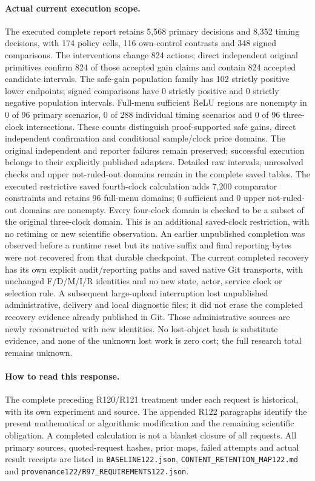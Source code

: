 \paragraph{Actual current execution scope.}
The executed complete report retains 5,568 primary decisions and 8,352 timing decisions, with 174 policy cells, 116 own-control contrasts and 348 signed comparisons. The interventions change 824 actions; direct independent original primitives confirm 824 of those accepted gain claims and contain 824 accepted candidate intervals. The safe-gain population family has 102 strictly positive lower endpoints; signed comparisons have 0 strictly positive and 0 strictly negative population intervals. Full-menu sufficient ReLU regions are nonempty in 0 of 96 primary scenarios, 0 of 288 individual timing scenarios and 0 of 96 three-clock intersections. These counts distinguish proof-supported safe gains, direct independent confirmation and conditional sample/clock price domains. The original independent and reporter failures remain preserved; successful execution belongs to their explicitly published adapters. Detailed raw intervals, unresolved checks and upper not-ruled-out domains remain in the complete saved tables. The executed restrictive saved fourth-clock calculation adds 7,200 comparator constraints and retains 96 full-menu domains; 0 sufficient and 0 upper not-ruled-out domains are nonempty. Every four-clock domain is checked to be a subset of the original three-clock domain. This is an additional saved-clock restriction, with no retiming or new scientific observation. An earlier unpublished completion was observed before a runtime reset but its native suffix and final reporting bytes were not recovered from that durable checkpoint. The current completed recovery has its own explicit audit/reporting paths and saved native Git transports, with unchanged F/D/M/I/R identities and no new state, actor, service clock or selection rule. A subsequent large-upload interruption lost unpublished administrative, delivery and local diagnostic files; it did not erase the completed recovery evidence already published in Git. Those administrative sources are newly reconstructed with new identities. No lost-object hash is substitute evidence, and none of the unknown lost work is zero cost; the full research total remains unknown.

\paragraph{How to read this response.}
The complete preceding R120/R121 treatment under each request is historical, with its own experiment and source. The appended R122 paragraphs identify the present mathematical or algorithmic modification and the remaining scientific obligation. A completed calculation is not a blanket closure of all requests. All primary sources, quoted-request hashes, prior maps, failed attempts and actual result receipts are listed in \nolinkurl{BASELINE122.json}, \nolinkurl{CONTENT_RETENTION_MAP122.md} and \nolinkurl{provenance122/R97_REQUIREMENTS122.json}.

